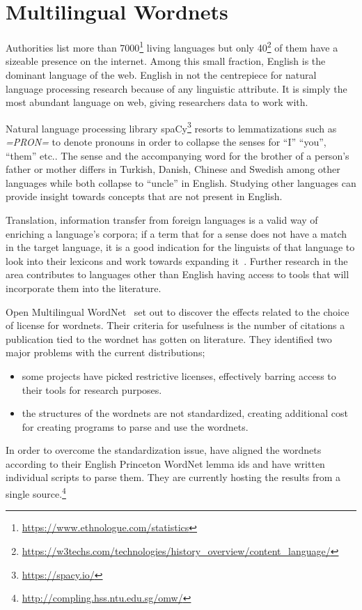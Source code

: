 \section{Multilingual Wordnets}%
\label{sec:multilingual_wordnets}
Authorities list more than 7000\footnote{\url{https://www.ethnologue.com/statistics}} living languages but only 40\footnote{\url{https://w3techs.com/technologies/history_overview/content_language/}} of them have a sizeable presence on the internet.
Among this small fraction, English is the dominant language of the web.
English in not the centrepiece for natural language processing research because of any linguistic attribute.
It is simply the most abundant language on web, giving researchers data to work with.

Natural language processing library spaCy\footnote{\url{https://spacy.io/}} resorts to lemmatizations such as \emph{=PRON=} to denote pronouns in order to collapse the senses for \enquote{I} \enquote{you}, \enquote{them} etc.\@.
The sense and the accompanying word for the brother of a person's father or mother differs in Turkish, Danish, Chinese and Swedish among other languages while both collapse to \enquote{uncle} in English.
Studying other languages can provide insight towards concepts that are not present in English.

Translation, information transfer from foreign languages is a valid way of enriching a language's corpora; if a term that for a sense does not have a match in the target language, it is a good indication for the linguists of that language to look into their lexicons and work towards expanding it~\cite{ibrahim_usta_turkce_2006}.
Further research in the area contributes to languages other than English having access to tools that will incorporate them into the literature.

Open Multilingual WordNet~\cite{bond_survey_2012, bond_linking_2013} set out to discover the effects related to the choice of license for wordnets.
Their criteria for usefulness is the number of citations a publication tied to the wordnet has gotten on literature.
They identified two major problems with the current distributions;
\begin{itemize}
    \item some projects have picked restrictive licenses, effectively barring access to their tools for research purposes.
    \item the structures of the wordnets are not standardized, creating additional cost for creating programs to parse and use the wordnets.
\end{itemize}
In order to overcome the standardization issue, \citeauthor{bond_survey_2012} have aligned the wordnets according to their English Princeton WordNet lemma ids and have written individual scripts to parse them.
They are currently hosting the results from a single source.\footnote{\url{http://compling.hss.ntu.edu.sg/omw/}}

